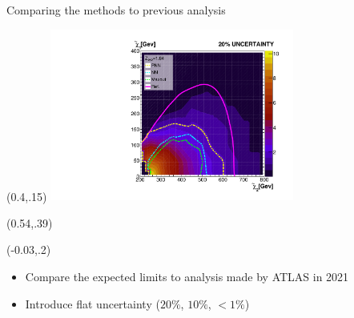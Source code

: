 \documentclass[UKenglish]{beamer}
\begin{document}
\begin{frame}{Comparing the methods to previous analysis}
    \begin{textblock}{1}(0.4,.15)
    \includegraphics[width=0.6\textwidth]{figures/Limits/compLimit20.pdf}
    \end{textblock}
    \begin{textblock}{1}(0.54,.39)
        \scriptsize
        \cite{atlas_search_2021}
    \end{textblock}
    \begin{textblock}{.45}(-0.03,.2)
    \begin{itemize}
        \item Compare the expected limits to analysis made by ATLAS in 2021 \cite{atlas_search_2021}
        \item Introduce flat uncertainty ($20\%$, $10\%$, $<1\%$) 
    \end{itemize}
\end{textblock}
\end{frame}
\end{document}

